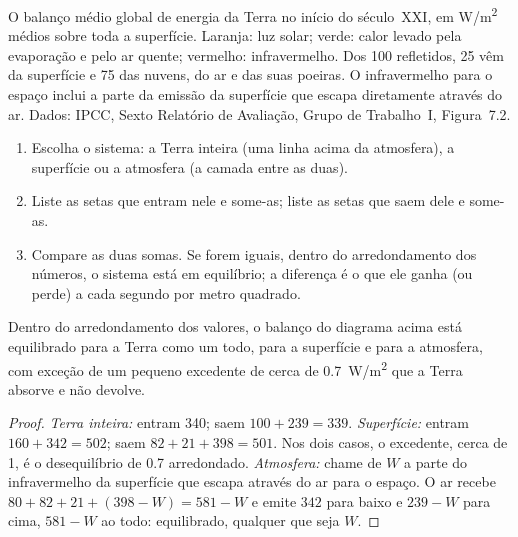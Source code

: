 \begin{omfigure}
{\small O balanço médio global de energia da Terra no início do
século~XXI, em \unit{W/m^2} médios sobre toda a superfície. Laranja: luz
solar; verde: calor levado pela evaporação e pelo ar quente; vermelho:
infravermelho. Dos 100 refletidos, 25 vêm da superfície e 75 das nuvens, do
ar e das suas poeiras. O infravermelho para o espaço inclui a parte da
emissão da superfície que escapa diretamente através do ar. Dados: IPCC,
Sexto Relatório de Avaliação, Grupo de Trabalho~I, Figura~7.2.}
\end{omfigure}

\begin{method}\label{met:g10:earth-energy-budget:reading}
\begin{enumerate}
  \item Escolha o sistema: a Terra inteira (uma linha acima da atmosfera),
        a superfície ou a atmosfera (a camada entre as duas).
  \item Liste as setas que entram nele e some-as; liste as setas que saem
        dele e some-as.
  \item Compare as duas somas. Se forem iguais, dentro do arredondamento
        dos números, o sistema está em equilíbrio; a diferença é o que ele
        ganha (ou perde) a cada segundo por metro quadrado.
\end{enumerate}
\end{method}

\begin{proposition}\label{prop:g10:earth-energy-budget:balance}
Dentro do arredondamento dos valores, o balanço do diagrama acima está
equilibrado para a Terra como um todo, para a superfície e para a
atmosfera, com exceção de um pequeno excedente de cerca de
\qty{0.7}{W/m^2} que a Terra absorve e não devolve.
\end{proposition}

\begin{proof}
\emph{Terra inteira:} entram 340; saem $100 + 239 = 339$.
\emph{Superfície:} entram $160 + 342 = 502$; saem $82 + 21 + 398 = 501$. Nos
dois casos, o excedente, cerca de 1, é o desequilíbrio de 0.7 arredondado.
\emph{Atmosfera:} chame de $W$ a parte do infravermelho da superfície que
escapa através do ar para o espaço. O ar recebe
$80 + 82 + 21 + (398 - W) = 581 - W$ e emite $342$ para baixo e $239 - W$
para cima, $581 - W$ ao todo: equilibrado, qualquer que seja $W$.
\end{proof}


